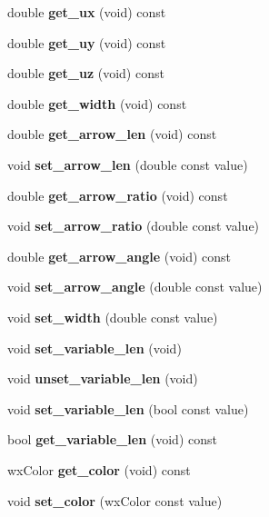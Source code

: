 \begin{CompactItemize}
\item 
double {\bf get\_\-ux} (void) const \label{classDraw__Vector_a13}

\item 
double {\bf get\_\-uy} (void) const \label{classDraw__Vector_a14}

\item 
double {\bf get\_\-uz} (void) const \label{classDraw__Vector_a15}

\item 
double {\bf get\_\-width} (void) const \label{classDraw__Vector_a16}

\item 
double {\bf get\_\-arrow\_\-len} (void) const \label{classDraw__Vector_a17}

\item 
void {\bf set\_\-arrow\_\-len} (double const value)\label{classDraw__Vector_a18}

\item 
double {\bf get\_\-arrow\_\-ratio} (void) const \label{classDraw__Vector_a19}

\item 
void {\bf set\_\-arrow\_\-ratio} (double const value)\label{classDraw__Vector_a20}

\item 
double {\bf get\_\-arrow\_\-angle} (void) const \label{classDraw__Vector_a21}

\item 
void {\bf set\_\-arrow\_\-angle} (double const value)\label{classDraw__Vector_a22}

\item 
void {\bf set\_\-width} (double const value)\label{classDraw__Vector_a23}

\item 
void {\bf set\_\-variable\_\-len} (void)\label{classDraw__Vector_a24}

\item 
void {\bf unset\_\-variable\_\-len} (void)\label{classDraw__Vector_a25}

\item 
void {\bf set\_\-variable\_\-len} (bool const value)\label{classDraw__Vector_a26}

\item 
bool {\bf get\_\-variable\_\-len} (void) const \label{classDraw__Vector_a27}

\item 
wx\-Color {\bf get\_\-color} (void) const \label{classDraw__Vector_a28}

\item 
void {\bf set\_\-color} (wx\-Color const value)\label{classDraw__Vector_a29}

\end{CompactItemize}


